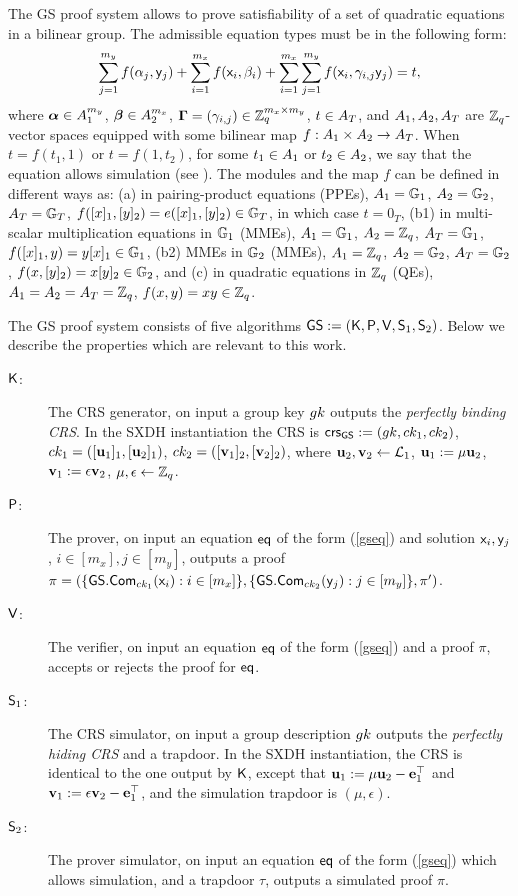 The GS proof system allows to prove satisfiability of a set of quadratic equations in a bilinear group. The admissible equation types must be in the following form:
\begin{equation}\label{gseq}
\sum_{j=1}^{m_y} f(\alpha_j, \mathsf{y}_j)+\sum_{i=1}^{m_x} f(\mathsf{x}_i, \beta_i)+\sum_{i=1}^{m_x} \sum_{j=1}^{m_y}  f(\mathsf{x}_i,\gamma_{i,j} \mathsf{y}_j)=t,
\end{equation}
 where $\boldsymbol \alpha  \in A_1^{m_y}$, $\boldsymbol \beta  \in A_2^{m_x}$, $\mathbf{{\Gamma}}=(\gamma_{i,j}) \in \mathbb{Z}_q^{m_x\times m_y}$, $t \in A_T$, and $A_1,A_2,A_T$ are $\mathbb{Z}_q$-vector spaces
equipped with some bilinear map $f:A_1\times A_2 \rightarrow A_T$.
When $t=f(t_1,1)$ or $t=f(1,t_2)$, for some $t_1\in A_1$ or $t_2\in A_2$, we say that the equation allows simulation (see \cite{SIAM:GroSah12}). The modules and the map $f$ can be defined in different ways as: (a) in pairing-product equations (PPEs), $A_1=\mathbb{G}_1$, $A_2=\mathbb{G}_2$, $A_T=\mathbb{G}_T$, $f([x]_1,[y]_2)=e([x]_1,[y]_2) \in \mathbb{G}_T$, in which case $t=0_{T}$, (b1) in multi-scalar multiplication equations in $\mathbb{G}_1$ (MMEs), $A_1=\mathbb{G}_1$, $A_2=\mathbb{Z}_q$, $A_T=\mathbb{G}_1$, $f([x]_1,y)=y [x]_1 \in \mathbb{G}_1$,  (b2) MMEs in $\mathbb{G}_2$ (MMEs),  $A_1=\mathbb{Z}_q$, $A_2=\mathbb{G}_2$, $A_T=\mathbb{G}_2$, $f(x,[y]_2)=x [y]_2 \in \mathbb{G}_2$, and (c) in quadratic equations in $\mathbb{Z}_q$ (QEs), $A_1=A_2=A_T=\mathbb{Z}_q$, $f(x,y)=xy \in \mathbb{Z}_q$. 

The GS proof system consists of five algorithms ${\mathsf{GS}}:=(\mathsf{K},\mathsf{P},\mathsf{V},\mathsf{S}_1,\mathsf{S}_2)$. Below we describe the properties which are relevant to this work.
\begin{description}
\item[$\mathsf{K}$:] The CRS generator, on input a group key ${gk}$ outputs the \emph{perfectly binding CRS}.  In the SXDH instantiation the CRS is $\mathsf{crs}_{\mathsf{GS}}:=({gk},ck_1,ck_2)$, 
$ck_1=([\mathbf{u}_1]_1,[\mathbf{u}_2]_1)$,
 $ck_2=([\mathbf{v}_1]_2,[\mathbf{v}_2]_2)$, 
 where $\mathbf{u}_2,\mathbf{v}_2 \gets \mathcal{L}_1$, $\mathbf{u}_1:=\mu \mathbf{u}_2 $, $\mathbf{v}_1:=\epsilon \mathbf{v}_2$, $\mu,\epsilon\gets\mathbb{Z}_q$.
\item[$\mathsf{P}$:] The prover, on input an equation $\mathsf{eq}$ of the form (\ref{gseq}) and solution $\mathsf{x}_i,\mathsf{y}_j$, $i\in[m_x],j\in[m_y]$, outputs a proof $\pi=(\{{\mathsf{GS}}.\mathsf{Com}_{ck_1}(\mathsf{x}_i):i\in[m_x]\},\{{\mathsf{GS}}.\mathsf{Com}_{ck_2}(\mathsf{y}_j):j\in[m_y]\},\pi')$.
\item[$\mathsf{V}$:] The verifier, on input an equation $\mathsf{eq}$ of the form (\ref{gseq}) and a proof $\pi$, accepts or rejects the proof for $\mathsf{eq}$.
\item[$\mathsf{S}_1$:]  The CRS simulator, on input a group description ${gk}$ outputs the \emph{perfectly hiding CRS}  and a trapdoor. In the SXDH instantiation, the CRS is identical to the one output by $\mathsf{K}$, except that $\mathbf{u}_1:=\mu \mathbf{u}_2-\mathbf{e}_1^\top$ and $\mathbf{v}_1:=\epsilon \mathbf{v}_2-\mathbf{e}_1^\top$, and the simulation trapdoor is $(\mu,\epsilon)$.
\item[$\mathsf{S}_2$:] The prover simulator, on input an equation $\mathsf{eq}$ of the form (\ref{gseq}) which allows simulation, and a trapdoor $\tau$, outputs a simulated proof $\pi$.
\end{description}

